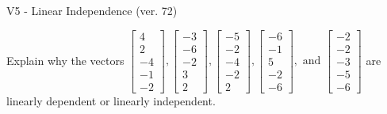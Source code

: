\begin{exercise}
  \begin{exerciseTitle}V5 - Linear Independence (ver. 72)\end{exerciseTitle}
  \begin{exerciseStatement}
    Explain why the vectors \(\left[\begin{array}{r}
4 \\
2 \\
-4 \\
-1 \\
-2
\end{array}\right] , \left[\begin{array}{r}
-3 \\
-6 \\
-2 \\
3 \\
2
\end{array}\right] , \left[\begin{array}{r}
-5 \\
-2 \\
-4 \\
-2 \\
2
\end{array}\right] , \left[\begin{array}{r}
-6 \\
-1 \\
5 \\
-2 \\
-6
\end{array}\right] , \text{ and } \left[\begin{array}{r}
-2 \\
-2 \\
-3 \\
-5 \\
-6
\end{array}\right]\) are linearly dependent or linearly independent.	



\end{exerciseStatement}
\end{exercise}
